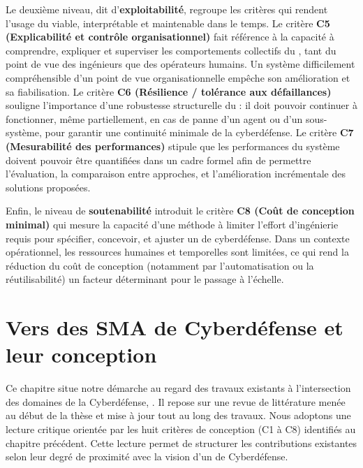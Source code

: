 Le deuxième niveau, dit d’\textbf{exploitabilité}, regroupe les critères qui rendent l’usage du  viable, interprétable et maintenable dans le temps. Le critère \textbf{C5 (Explicabilité et contrôle organisationnel)} fait référence à la capacité à comprendre, expliquer et superviser les comportements collectifs du , tant du point de vue des ingénieurs que des opérateurs humains. Un système difficilement compréhensible d'un point de vue organisationnelle empêche son amélioration et sa fiabilisation. Le critère \textbf{C6 (Résilience / tolérance aux défaillances)} souligne l’importance d’une robustesse structurelle du  : il doit pouvoir continuer à fonctionner, même partiellement, en cas de panne d’un agent ou d’un sous-système, pour garantir une continuité minimale de la cyberdéfense. Le critère \textbf{C7 (Mesurabilité des performances)} stipule que les performances du système doivent pouvoir être quantifiées dans un cadre formel afin de permettre l’évaluation, la comparaison entre approches, et l’amélioration incrémentale des solutions proposées.

Enfin, le niveau de \textbf{soutenabilité} introduit le critère \textbf{C8 (Coût de conception minimal)} qui mesure la capacité d’une méthode à limiter l’effort d’ingénierie requis pour spécifier, concevoir, et ajuster un  de cyberdéfense. Dans un contexte opérationnel, les ressources humaines et temporelles sont limitées, ce qui rend la réduction du coût de conception (notamment par l’automatisation ou la réutilisabilité) un facteur déterminant pour le passage à l'échelle.

\clearpage
\thispagestyle{empty}
\null
\newpage

\chapter{Vers des SMA de Cyberdéfense et leur conception}

% 

\noindent
Ce chapitre situe notre démarche au regard des travaux existants à l'intersection des domaines de la Cyberdéfense, . Il repose sur une revue de littérature menée au début de la thèse et mise à jour tout au long des travaux.
%
Nous adoptons une lecture critique orientée par les huit critères de conception (C1 à C8) identifiés au chapitre précédent. Cette lecture permet de structurer les contributions existantes selon leur degré de proximité avec la vision d'un  de Cyberdéfense.

